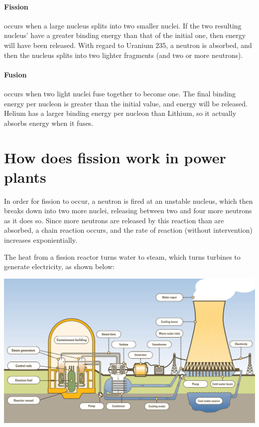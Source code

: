 \documentclass{article}
\begin{document}
\paragraph*{Fission} occurs when a large nucleus splits into two smaller nuclei.
If the two resulting nucleus' have a greater binding energy than that of the
initial one, then energy will have been released. With regard to Uranium 235, a
neutron is absorbed, and then the nucleus splits into two lighter fragments (and
two or more neutrons).

\paragraph*{Fusion} occurs when two light nuclei fuse together to become one.
The final binding energy per nucleon is greater than the initial value, and
energy will be released. Helium has a larger binding energy per nucleon than
Lithium, so it actually absorbs energy when it fuses.

\section*{How does fission work in power plants}

In order for fission to occur, a neutron is fired at an unstable nucleus, which
then breaks down into two more nuclei, releasing between two and four more
neutrons as it does so. Since more neutrons are released by this reaction than
are absorbed, a chain reaction occurs, and the rate of reaction (without
intervention) increases exponientially.

The heat from a fission reactor turns water to steam, which turns turbines to generate electricity, as shown below:

\begin{center}
	\includegraphics[scale=0.18]{reactor}
\end{center}
\end{document}
